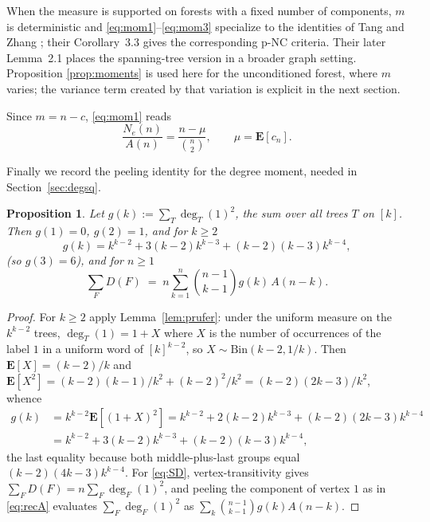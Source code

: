 \documentclass[11pt,a4paper]{amsart}
\theoremstyle{plain}
\newtheorem{proposition}[theorem]{Proposition}
\theoremstyle{definition}
\newcommand{\EX}{\mathbf{E}}
\newcommand{\dg}{\operatorname{deg}}
\newcommand{\Nc}{N}
\begin{document}
When the measure is supported on forests with a fixed number of components,
$m$ is deterministic and \eqref{eq:mom1}--\eqref{eq:mom3} specialize to the
identities of Tang and Zhang \cite[Lemma~3.2]{TZ2026a}; their Corollary~3.3 gives
the corresponding p-NC criteria. Their later Lemma~2.1 \cite{TZ2026b} places
the spanning-tree version in a broader graph setting. Proposition
\ref{prop:moments} is used here for the unconditioned forest, where $m$ varies;
the variance term created by that variation is explicit in the next section.

Since $m = n-c$, \eqref{eq:mom1} reads
\begin{equation}\label{eq:NeA}
  \frac{\Nc_e(n)}{A(n)} = \frac{n-\mu}{\binom{n}{2}},\qquad \mu = \EX[c_n].
\end{equation}

Finally we record the peeling identity for the degree moment, needed in
Section~\ref{sec:degsq}.

\begin{proposition}\label{prop:degsum}
Let $g(k) := \sum_{T} \dg_T(1)^2$, the sum over all trees $T$ on $[k]$. Then
$g(1)=0$, $g(2)=1$, and for $k \ge 2$
\begin{equation}\label{eq:gk}
  g(k) = k^{k-2}+3(k-2)k^{k-3}+(k-2)(k-3)k^{k-4},
\end{equation}
(so $g(3)=6$), and for $n \ge 1$
\begin{equation}\label{eq:SD}
  \sum_F D(F) \;=\; n\sum_{k=1}^{n}\binom{n-1}{k-1} g(k)\,A(n-k).
\end{equation}
\end{proposition}

\begin{proof}
For $k \ge 2$ apply Lemma~\ref{lem:prufer}: under the uniform measure on the
$k^{k-2}$ trees, $\dg_T(1) = 1+X$ where $X$ is the number of occurrences of the
label $1$ in a uniform word of $[k]^{k-2}$, so $X \sim \mathrm{Bin}(k-2,1/k)$.
Then $\EX[X] = (k-2)/k$ and
$\EX[X^2] = (k-2)(k-1)/k^2+(k-2)^2/k^2 = (k-2)(2k-3)/k^2$, whence
\begin{align*}
  g(k) &= k^{k-2}\EX[(1+X)^2]
        = k^{k-2}+2(k-2)k^{k-3}+(k-2)(2k-3)k^{k-4}\\
       &= k^{k-2}+3(k-2)k^{k-3}+(k-2)(k-3)k^{k-4},
\end{align*}
the last equality because both middle-plus-last groups equal
$(k-2)(4k-3)k^{k-4}$. For \eqref{eq:SD}, vertex-transitivity gives
$\sum_F D(F) = n\sum_F \dg_F(1)^2$, and peeling the component of vertex $1$ as in
\eqref{eq:recA} evaluates $\sum_F \dg_F(1)^2$ as
$\sum_k \binom{n-1}{k-1} g(k) A(n-k)$.
\end{proof}
\end{document}
